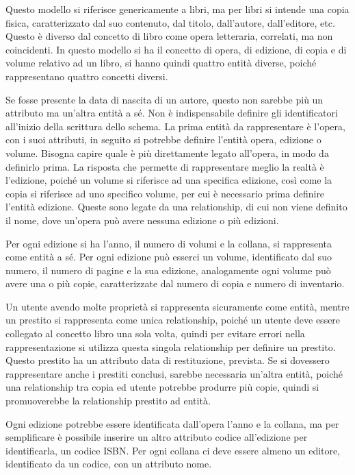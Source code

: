 \documentclass{article}
\begin{document}
Questo modello si riferisce genericamente a libri, ma per libri si intende una copia fisica, caratterizzato dal suo contenuto, dal titolo, dall'autore, dall'editore, etc. 
Questo è diverso dal concetto di libro come opera letteraria, correlati, ma non coincidenti. In questo modello si ha il concetto di opera, di edizione, di copia e di 
volume relativo ad un libro, si hanno quindi quattro entità diverse, poiché rappresentano quattro concetti diversi. 

Se fosse presente la data di nascita di un autore, questo non sarebbe più un attributo ma un'altra entità a sé. Non è indispensabile definire gli identificatori 
all'inizio della scrittura dello schema. La prima entità da rappresentare è l'opera, con i suoi attributi, in seguito si potrebbe definire l'entità opera, edizione o 
volume. Bisogna capire quale è più direttamente legato all'opera, in modo da definirlo prima. La risposta che permette di rappresentare meglio la realtà è l'edizione, 
poiché un volume si riferisce ad una specifica edizione, così come la copia si riferisce ad uno specifico volume, per cui è necessario prima definire l'entità 
edizione. Queste sono legate da una relationship, di cui non viene definito il nome, dove un'opera può avere nessuna edizione o più edizioni. 

Per ogni edizione si ha l'anno, il numero di volumi e la collana, si rappresenta come entità a sé. 
Per ogni edizione può esserci un volume, identificato dal suo numero, il numero di pagine e la sua edizione, analogamente ogni volume può avere una o più copie, 
caratterizzate dal numero di copia e numero di inventario. 

Un utente avendo molte proprietà si rappresenta sicuramente come entità, mentre un prestito si rappresenta come unica relationship, poiché un utente deve essere 
collegato al concetto libro una sola volta, quindi per evitare errori nella rappresentazione si utilizza questa singola relationship per definire un prestito. 
Questo prestito ha un attributo data di restituzione, prevista. Se si dovessero rappresentare anche i prestiti conclusi, sarebbe necessaria un'altra entità, poiché 
una relationship tra copia ed utente potrebbe produrre più copie, quindi si promuoverebbe la relationship prestito ad entità. 

Ogni edizione potrebbe essere identificata dall'opera l'anno e la collana, ma per semplificare è possibile inserire un altro attributo codice all'edizione per 
identificarla, un codice ISBN. Per ogni collana ci deve essere almeno un editore, identificato da un codice, con un attributo nome. 
\end{document}
